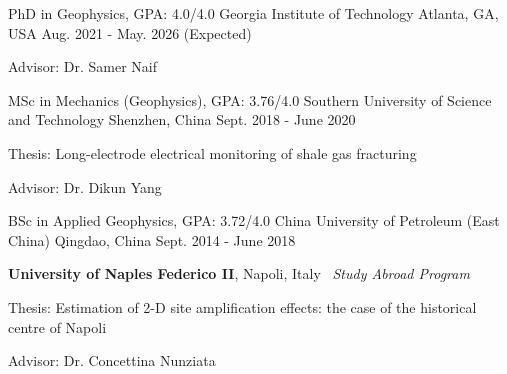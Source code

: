 

\begin{cventries}

  \cventry
    {PhD in Geophysics, GPA: 4.0/4.0} %
    {Georgia Institute of Technology} %
    {Atlanta, GA, USA} %
    {Aug. 2021 - May. 2026 (Expected)} %
    {
      \begin{cvitems} %
        \item {Advisor: Dr. Samer Naif}
      \end{cvitems}
    }

  \cventry
    {MSc in Mechanics (Geophysics), GPA: 3.76/4.0} %
    {Southern University of Science and Technology} %
    {Shenzhen, China} %
    {Sept. 2018 - June 2020} %
    {
      \begin{cvitems} %
        \item {Thesis: Long-electrode electrical monitoring of shale gas fracturing}
        \item {Advisor: Dr. Dikun Yang}
      \end{cvitems}
    }

  \cventry
    {BSc in Applied Geophysics, GPA: 3.72/4.0} %
    {China University of Petroleum (East China)} %
    {Qingdao, China} %
    {Sept. 2014 - June 2018} %
    {
      \begin{cvitems} %
        \item {\textbf{University of Naples Federico II}, Napoli, Italy \textemdash \, \itshape Study Abroad Program}
        \item {Thesis: Estimation of 2-D site amplification effects: the case of the historical centre of Napoli}
        \item {Advisor: Dr. Concettina Nunziata}
      \end{cvitems}
    }

\end{cventries}
